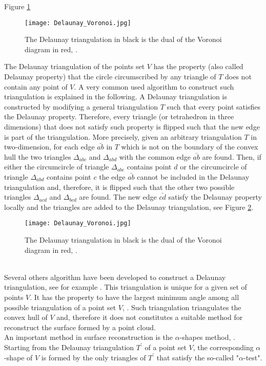 Figure \ref{fig:Voronoi}
\begin{figure}[h]\label{fig:Voronoi}
\begin{center}
\texttt{[image: Delaunay\_Voronoi.jpg]}
\caption{The Delaunay triangulation in black is the dual of the Voronoi diagram in red, \cite{Wiki4}.}
\label{fig:Voronoi}
\end{center}
\end{figure}
The Delaunay triangulation of the points set $V$ has the property (also called Delaunay property) that the circle circumscribed by any triangle of $T$ does not contain any point of $V$. A very common used algorithm to construct such triangulation is explained in the following. 
A Delaunay triangulation is constructed by modifying a general triangulation $T$ such that every point satisfies the Delaunay property. 
Therefore, every triangle (or tetrahedron in three dimensions) that does not satisfy such property is flipped such that the new edge is part of the triangulation. 
More precisely, given an arbitrary triangulation $T$ in two-dimension, for each edge $\bar{ab}$ in $T$ which is not on the boundary of the convex hull the two triangles 
$\Delta_{abc}$ and $\Delta_{abd}$ with the common edge $\bar{ab}$ are found. Then, if either the circumcircle of triangle $\Delta_{abc}$ contains point $d$ or the circumcircle of triangle $\Delta_{abd}$ contains point $c$ the edge $\bar{ab}$ cannot be included in the Delaunay triangulation and, therefore, it is flipped such that the other two possible triangles $\Delta_{acd}$ and $\Delta_{bcd}$ are found. The new edge $\bar{cd}$ satisfy the Delaunay property locally and the triangles are added to the Delaunay triangulation, see Figure \ref{fig:Delaunay}.  
\begin{figure}[h]\label{fig:Delaunay}
\begin{center}
\texttt{[image: Delaunay\_Voronoi.jpg]}
\label{fig:shape}
\caption{The Delaunay triangulation in black is the dual of the Voronoi diagram in red, \cite{Wiki4}.}
\label{fig:Delaunay}
\end{center}
\end{figure}
\\ \indent Several others algorithm have been developed to construct a Delaunay triangulation, see for example \cite{lee1980two, renka1997algorithm}.
This triangulation is unique for a given set of points $V$. It has the property to have the largest minimum angle among all possible triangulation of a point set $V$, \cite{press2007numerical}. Such triangulation triangulates the convex hull of $V$ and, therefore it does not constitutes a suitable method for reconstruct the surface formed by a point cloud. \\ \indent An important method in surface reconstruction is the $\alpha$-shapes method, \cite{edelsbrunner2010alpha, guo1997surface}. Starting from the Delaunay triangulation $T^\prime$ of a point set $V$, the corresponding $\alpha$-shape of $V$ is formed by the only triangles of $T^\prime$ that satisfy the so-called "$\alpha$-test".
